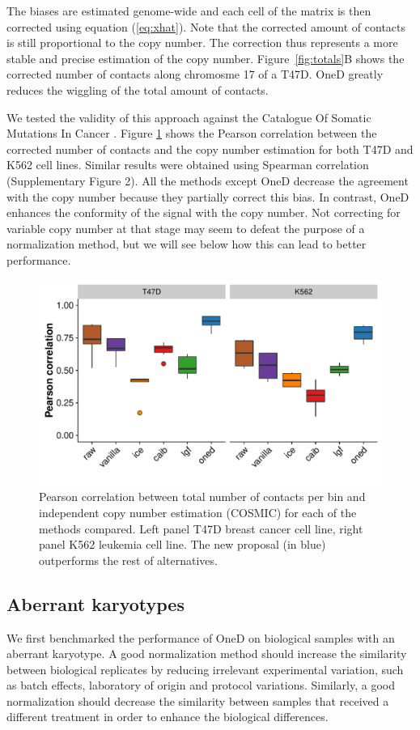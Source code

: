 \documentclass{bioinfo}
\begin{document}
The biases are estimated genome-wide and each cell of the matrix is then
corrected using equation (\ref{eq:xhat}). Note that the corrected amount
of contacts is still proportional to the copy number. The correction thus
represents a more stable and precise estimation of the copy number.
Figure~\ref{fig:totals}B shows the corrected number of contacts along
chromosme 17 of a T47D. OneD greatly reduces the wiggling of the total
amount of contacts.

We tested the validity of this approach against the Catalogue Of Somatic
Mutations In Cancer \citep[COSMIC,][]{forbes2010cosmic}. Figure
\ref{fig:copy_number} shows the Pearson correlation between the corrected
number of contacts and the copy number estimation for both T47D and K562
cell lines. Similar results were obtained using Spearman correlation
(Supplementary Figure 2). All the methods except OneD decrease the
agreement with the copy number because they partially correct this bias.
In contrast, OneD enhances the conformity of the signal with the copy
number. Not correcting for variable copy number at that stage may seem to
defeat the purpose of a normalization method, but we will see below how
this can lead to better performance.


\begin{figure}
	\centerline{\includegraphics[width=.45\textwidth]
{img/copy_number_figure2.pdf}}
	\caption{
    Pearson correlation between total number of contacts per bin and
independent copy number estimation (COSMIC) for each of the methods
compared. Left panel T47D breast cancer cell line, right panel K562
leukemia cell line. The new proposal (in blue) outperforms the rest of
alternatives.  }\label{fig:copy_number}
\end{figure}




\subsection{Aberrant karyotypes}

We first benchmarked the performance of OneD on biological samples with an
aberrant karyotype. A good normalization method should increase the
similarity between biological replicates by reducing irrelevant
experimental variation, such as batch effects, laboratory of origin and
protocol variations. Similarly, a good normalization should decrease the
similarity between samples that received a different treatment in order to
enhance the biological differences.
\end{document}
